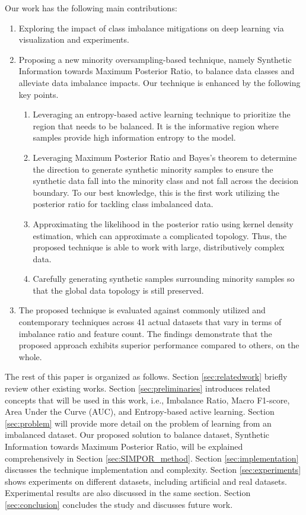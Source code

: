 \documentclass[journal]{IEEEtai}
\newcommand{\R}[1]{\label{#1}\linelabel{#1}}
\newcommand{\MethodnameLong}{Synthetic Information towards Maximum Posterior Ratio}
\begin{document}
Our work has the following main contributions:
\begin{enumerate}
	\item{Exploring the impact of class imbalance mitigations on deep learning via visualization and experiments.}
	\item{Proposing a new minority oversampling-based technique, namely \MethodnameLong, to balance data classes and alleviate data imbalance impacts. Our technique is enhanced by the following key points.}
	\begin{enumerate}
		\item Leveraging an entropy-based active learning technique to prioritize the region that needs to be balanced. It is the informative region where samples provide high information entropy to the model. 
		\item Leveraging Maximum Posterior Ratio and Bayes's theorem to determine the direction to generate synthetic minority samples to ensure the synthetic data fall into the minority class and not fall across the decision boundary. To our best knowledge, this is the first work utilizing the posterior ratio for tackling class imbalanced data. 
		\item Approximating the likelihood in the posterior ratio using kernel density estimation, which can approximate a complicated topology. Thus, the proposed technique is able to work with large, distributively complex data. 
		\item Carefully generating synthetic samples surrounding minority samples so that the global data topology is still preserved. 
	\end{enumerate}
	\item{The proposed technique is evaluated against commonly utilized and contemporary techniques across 41 actual datasets that vary in terms of imbalance ratio and feature count. The findings demonstrate that the proposed approach exhibits superior performance compared to others, on the whole.}
\end{enumerate}


The rest of this paper is organized as follows. Section \ref{sec:relatedwork} briefly review other existing works. Section \ref{sec:preliminaries} introduces related concepts that will be used in this work, i.e., Imbalance Ratio, Macro F1-score, \R{AUCabbreviation}Area Under the Curve (AUC), and Entropy-based active learning. Section \ref{sec:problem} will provide more detail on the problem of learning from an imbalanced dataset. Our proposed solution to balance dataset, \MethodnameLong, will be explained comprehensively in Section \ref{sec:SIMPOR_method}. Section \ref{sec:implementation} discusses the technique implementation and complexity.  Section \ref{sec:experiments} shows experiments on different datasets, including artificial and real datasets. Experimental results are also discussed in the same section. Section \ref{sec:conclusion} concludes the study and discusses future work. 
\end{document}
